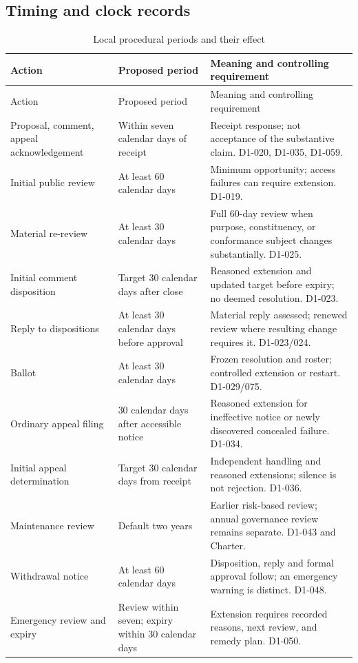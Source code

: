 \documentclass[11pt,a4paper]{article}
\begin{document}
\subsection{Timing and clock records}

\begin{longtable}{@{}L{0.30\textwidth}L{0.24\textwidth}L{0.36\textwidth}@{}}
\caption{Local procedural periods and their effect}\label{tab:d1-periods}\\
\toprule Action & Proposed period & Meaning and controlling requirement \\
\midrule\endfirsthead
\toprule Action & Proposed period & Meaning and controlling requirement \\
\midrule\endhead
Proposal, comment, appeal acknowledgement & Within seven calendar days of receipt & Receipt response; not acceptance of the substantive claim. D1-020, D1-035, D1-059. \\
Initial public review & At least 60 calendar days & Minimum opportunity; access failures can require extension. D1-019. \\
Material re-review & At least 30 calendar days & Full 60-day review when purpose, constituency, or conformance subject changes substantially. D1-025. \\
Initial comment disposition & Target 30 calendar days after close & Reasoned extension and updated target before expiry; no deemed resolution. D1-023. \\
Reply to dispositions & At least 30 calendar days before approval & Material reply assessed; renewed review where resulting change requires it. D1-023/024. \\
Ballot & At least 30 calendar days & Frozen resolution and roster; controlled extension or restart. D1-029/075. \\
Ordinary appeal filing & 30 calendar days after accessible notice & Reasoned extension for ineffective notice or newly discovered concealed failure. D1-034. \\
Initial appeal determination & Target 30 calendar days from receipt & Independent handling and reasoned extensions; silence is not rejection. D1-036. \\
Maintenance review & Default two years & Earlier risk-based review; annual governance review remains separate. D1-043 and Charter. \\
Withdrawal notice & At least 60 calendar days & Disposition, reply and formal approval follow; an emergency warning is distinct. D1-048. \\
Emergency review and expiry & Review within seven; expiry within 30 calendar days & Extension requires recorded reasons, next review, and remedy plan. D1-050. \\
\bottomrule
\end{longtable}
\end{document}
